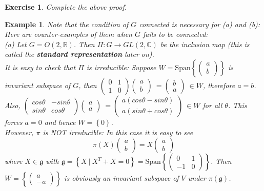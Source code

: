 \documentclass[11pt]{book}
\newtheorem{example}[theorem]{Example}
\newtheorem{exercise}[theorem]{Exercise}
\newcommand{\bb}[1]{\mathbb{#1}}
\newcommand{\mf}[1]{\mathfrak{#1}}
\begin{document}
\begin{exercise}
Complete the above proof.
\end{exercise}
\begin{example}
Note that the condition of $G$ connected is necessary for (a) and (b): Here are counter-examples of them when $G$ fails to be connected:\\
(a) Let $G = O(2,\bb{R})$. Then $\Pi: G \to GL(2,\bb{C})$ be the inclusion map (this is called the \textbf{standard representation} later on).\\
It is easy to check that $\Pi$ is irreducible: Suppose $W = \mathrm{Span}\left\{\left( \begin{array}{c}
a \\
b \end{array} \right)\right\}$ is invariant subspace of $G$, then $\left( \begin{array}{cc}
0 & 1 \\
1 & 0 \end{array} \right) \left( \begin{array}{c}
a \\
b \end{array} \right)\ = \left( \begin{array}{c}
b \\
a \end{array} \right)\ \in W$, therefore $a = b$. Also, $\left( \begin{array}{cc}
cos \theta & -sin \theta \\
sin \theta & cos \theta \end{array} \right) \left( \begin{array}{c}
a \\
a \end{array} \right)\ = \left( \begin{array}{c}
a(cos \theta - sin \theta) \\
a(sin \theta + cos \theta) \end{array} \right)\ \in W$ for all $\theta$. This forces $a = 0$ and hence $W = \left\{0\right\}$.\\
However, $\pi$ is NOT irreducible: In this case it is easy to see
$$\pi(X)\left( \begin{array}{c}
a \\
b \end{array} \right)  = X\left( \begin{array}{c}
a \\
b \end{array} \right)$$
where $X \in \mf{g}$ with $\mf{g} = \left\{X\ \Big|\ X^T + X = 0\right\} = \mathrm{Span}\left\{\left( \begin{array}{cc}
0 & 1 \\
-1 & 0  \end{array} \right) \right\}$. Then $W = \left\{ \left( \begin{array}{c}
a \\
-a \end{array} \right) \right\}$ is obviously an invariant subspace of $V$ under $\pi(\mf{g})$.\\


\end{example}
\end{document}
